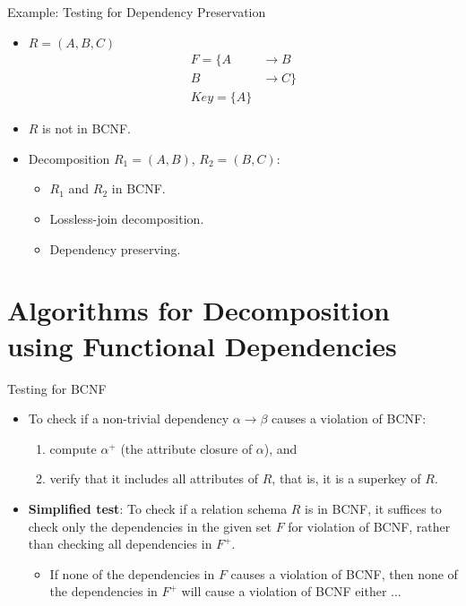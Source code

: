 \documentclass{beamer}
\begin{document}
\begin{frame}{Example: Testing for Dependency Preservation}
    \begin{itemize}
        \item $R = (A, B, C)$
            \begin{equation*}
                \begin{align*}
                    F = \{ A &\rightarrow B \\
                            B &\rightarrow C \} \\
                    Key = \{ A \}
                \end{align*}
            \end{equation*}
        \item $R$ is not in BCNF.
        \item Decomposition $R_1 = (A, B)$, $R_2 = (B, C)$:
            \begin{itemize}
                \item $R_1$ and $R_2$ in BCNF.
                \item Lossless-join decomposition.
                \item Dependency preserving.
            \end{itemize}
    \end{itemize}
\end{frame}



\section{Algorithms for Decomposition using Functional Dependencies}

\begin{frame}{Testing for BCNF}
    \footnotesize
    \begin{itemize}
        \item To check if a non-trivial dependency $\alpha \rightarrow \beta$ causes a violation of BCNF:
            \begin{enumerate}
                \item compute $\alpha^+$ (the attribute closure of $\alpha$), and
                \item verify that it includes all attributes of $R$, that is, it is a superkey of $R$.
            \end{enumerate}
        \item \textbf{Simplified test}: To check if a relation schema $R$ is in BCNF, it suffices to check only the dependencies in the given set $F$ for violation of BCNF, rather than checking all dependencies in $F^+$.
            \begin{itemize}
                \item If none of the dependencies in $F$ causes a violation of BCNF, then none of the dependencies in $F^+$ will cause a violation of BCNF either ...
            \end{itemize}
    \end{itemize}
\end{frame}
\end{document}
